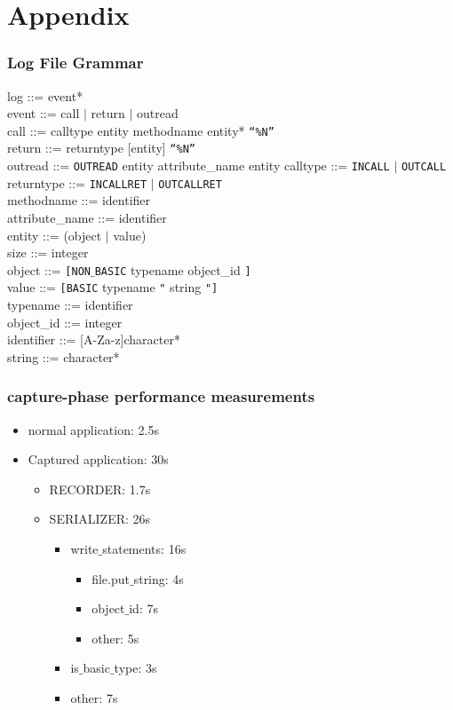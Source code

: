 \chapter{Appendix}

\subsection{Log File Grammar}
\label{sec:log_file_grammar}
log ::= event* \\
event ::= call $\mid$ return $\mid$ outread\\
call ::= calltype entity methodname entity* \texttt{“\%N”} \\
return ::= returntype [entity]  \texttt{“\%N”}\\
outread ::= \texttt{OUTREAD} entity attribute\_name entity
calltype ::= \texttt{INCALL} $\mid$ \texttt{OUTCALL} \\
returntype ::= \texttt{INCALLRET} $\mid$ \texttt{OUTCALLRET} \\
methodname ::= identifier \\
attribute\_name ::= identifier \\
entity ::= (object $\mid$ value) \\
size ::= integer \\
object ::= \texttt{[NON$\_$BASIC} typename object\_id \texttt{]} \\
value ::= \texttt{[BASIC} typename \texttt{"} string \texttt{"]} \\
typename ::= identifier \\
object\_id ::= integer\\
identifier ::= [A-Za-z]character*\\
string ::= character*\\

\subsection{capture-phase performance measurements}
\begin{itemize}
	\item normal application: 2.5s
	\item Captured application: 30s
	\begin{itemize}
		\item RECORDER: 1.7s\\
		\item SERIALIZER: 26s
		\begin{itemize}
			\item write$\_$statements: 16s
			\begin{itemize}
				\item file.put$\_$string: 4s
				\item object$\_$id: 7s
				\item other: 5s
			\end{itemize}
			\item is$\_$basic$\_$type: 3s
			\item other: 7s
		\end{itemize}
	\end{itemize}
\end{itemize}